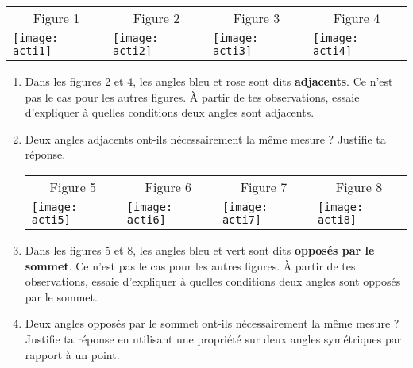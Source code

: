 \begin{activite}



\begin{tabularx}{\linewidth}{XXXX}
\multicolumn{1}{c}{Figure 1} &
\multicolumn{1}{c}{Figure 2} &
\multicolumn{1}{c}{Figure 3} &
\multicolumn{1}{c}{Figure 4} \\
\texttt{[image: acti1]} &
\texttt{[image: acti2]} &
\texttt{[image: acti3]} &
\texttt{[image: acti4]} \\ 
\end{tabularx}

\begin{enumerate}
\item Dans les figures 2 et 4, les angles bleu et rose sont dits \textbf{adjacents}. Ce n'est pas le cas pour les autres figures. À partir de tes observations, essaie d'expliquer à quelles conditions deux angles sont adjacents. 
\item Deux angles adjacents ont-ils nécessairement la même mesure ? Justifie ta réponse.

\vspace{1em}

\begin{tabularx}{\linewidth}{XXXX}
\multicolumn{1}{c}{Figure 5} &
\multicolumn{1}{c}{Figure 6} &
\multicolumn{1}{c}{Figure 7} &
\multicolumn{1}{c}{Figure 8} \\
\texttt{[image: acti5]} &
\texttt{[image: acti6]} &
\texttt{[image: acti7]} &
\texttt{[image: acti8]} \\ 
\end{tabularx}

\item Dans les figures 5 et 8, les angles bleu et vert sont dits \textbf{opposés par le sommet}. Ce n'est pas le cas pour les autres figures. À partir de tes observations, essaie d'expliquer à quelles conditions deux angles sont opposés par le sommet.
\item Deux angles opposés par le sommet ont-ils nécessairement la même mesure ? Justifie ta réponse en utilisant une propriété sur deux angles symétriques par rapport à un point.
\end{enumerate}
\end{activite}


